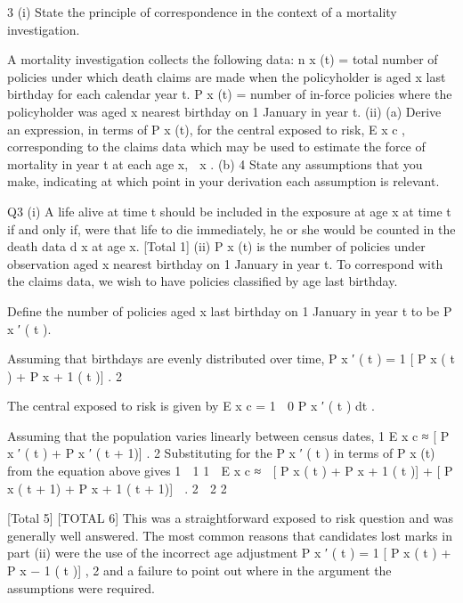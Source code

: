 \documentclass[a4paper,12pt]{article}
\begin{document}
3 (i)
State the principle of correspondence in the context of a mortality
investigation.

A mortality investigation collects the following data:
n x (t) = total number of policies under which death claims are made when the
policyholder is aged x last birthday for each calendar year t.
P x (t) = number of in-force policies where the policyholder was aged x nearest
birthday on 1 January in year t.
(ii)
(a)
Derive an expression, in terms of P x (t), for the central exposed to risk,
E x c , corresponding to the claims data which may be used to estimate
the force of mortality in year t at each age x,  x .
(b)
4
State any assumptions that you make, indicating at which point in your
derivation each assumption is relevant.













Q3
(i) A life alive at time t should be included in the exposure at age x at time t if and
only if, were that life to die immediately, he or she would be counted in the
death data d x at age x.
[Total 1]
(ii) P x (t) is the number of policies under observation aged x nearest birthday on
1 January in year t.
To correspond with the claims data, we wish to have policies classified by age
last birthday.

Define the number of policies aged x last birthday on 1 January in year t to be
P x ′ ( t ).

Assuming that birthdays are evenly distributed over time,
P x ′ ( t ) =
1
[ P x ( t ) + P x + 1 ( t )] .
2


The central exposed to risk is given by
E x c =
1
 0 P x ′ ( t ) dt .

Assuming that the population varies linearly between census dates, 
1
E x c ≈ [ P x ′ ( t ) + P x ′ ( t + 1)] .
2 
Substituting for the P x ′ ( t ) in terms of P x (t) from the equation above gives
1  1
1

E x c ≈  [ P x ( t ) + P x + 1 ( t )] + [ P x ( t + 1) + P x + 1 ( t + 1)]  .
2  2
2


[Total 5]
[TOTAL 6]
This was a straightforward exposed to risk question and was generally well
answered. The most common reasons that candidates lost marks in part (ii)
were the use of the incorrect age adjustment
P x ′ ( t ) =
1
[ P x ( t ) + P x − 1 ( t )] ,
2
and a failure to point out where in the argument the assumptions were
required.
\end{document}
